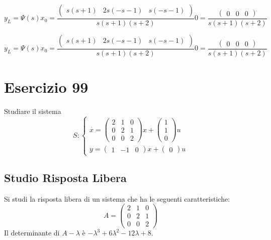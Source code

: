\documentclass{article}
\begin{document}
\[ y_L = \Psi(s) x_0 = \frac{\left(\begin{matrix}s \left(s + 1\right) & 2 s \left(- s - 1\right) & s \left(- s - 1\right)\end{matrix}\right)}{s \left(s + 1\right) \left(s + 2\right)} 0 = \frac{\left(\begin{matrix}0 & 0 & 0\end{matrix}\right)}{s \left(s + 1\right) \left(s + 2\right)} \]

\[ y_L = \Psi(s) x_0 = \frac{\left(\begin{matrix}s \left(s + 1\right) & 2 s \left(- s - 1\right) & s \left(- s - 1\right)\end{matrix}\right)}{s \left(s + 1\right) \left(s + 2\right)} 0 = \frac{\left(\begin{matrix}0 & 0 & 0\end{matrix}\right)}{s \left(s + 1\right) \left(s + 2\right)} \]
 
\section{Esercizio 99 }
 Studiare il sistema \[S:\begin{cases}\overset{\cdot}{x} = \left(\begin{matrix}2 & 1 & 0\\0 & 2 & 1\\0 & 0 & 2\end{matrix}\right) x+ \left(\begin{matrix}1\\1\\0\end{matrix}\right)u\\y = \left(\begin{matrix}1 & -1 & 0\end{matrix}\right) x +\left(\begin{matrix}0\end{matrix}\right) u\end{cases}\]\subsection{Studio Risposta Libera}
Si studi la risposta libera di un sistema che ha le seguenti caratteristiche: \[A = \left(\begin{matrix}2 & 1 & 0\\0 & 2 & 1\\0 & 0 & 2\end{matrix}\right)\]
Il determinante di $A-\lambda$ è $ - \lambda^{3} + 6 \lambda^{2} - 12 \lambda + 8 $.
\end{document}
